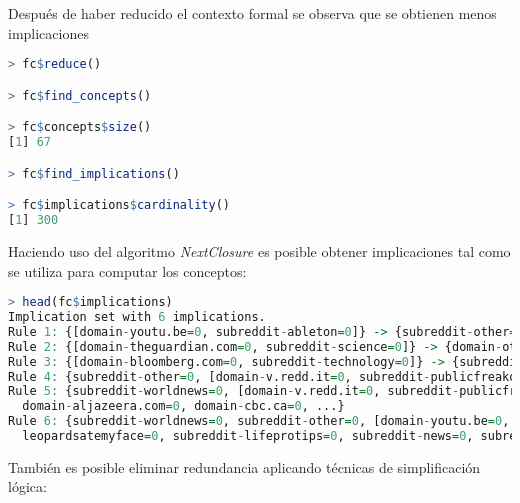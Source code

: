 \documentclass[../../main.tex]{subfiles}
\begin{document}
\vskip 0.2in

Después de haber reducido el contexto formal se observa que se obtienen menos implicaciones

\begin{lstlisting}[language=R]
> fc$reduce()

> fc$find_concepts()

> fc$concepts$size()
[1] 67

> fc$find_implications()

> fc$implications$cardinality()
[1] 300
\end{lstlisting}

\vskip 0.2in

Haciendo uso del algoritmo \textit{NextClosure} \cite{nextclosure} es posible obtener implicaciones tal como se utiliza para computar los conceptos:

\begin{lstlisting}[language=R]
> head(fc$implications)
Implication set with 6 implications.
Rule 1: {[domain-youtu.be=0, subreddit-ableton=0]} -> {subreddit-other=0}
Rule 2: {[domain-theguardian.com=0, subreddit-science=0]} -> {domain-other=0}
Rule 3: {[domain-bloomberg.com=0, subreddit-technology=0]} -> {subreddit-worldnews=0, subreddit-other=0}
Rule 4: {subreddit-other=0, [domain-v.redd.it=0, subreddit-publicfreakout=0]} -> subreddit-lifeprotips=0, subreddit-news=0, subreddit-todayilearned=0, subreddit-worldnews=0, [domain-bloomberg.com=0, subreddit-technology=0], [domain-theguardian.com=0, subreddit-science=0], [domain-youtu.be=0, subreddit-ableton=0], ...}
Rule 5: {subreddit-worldnews=0, [domain-v.redd.it=0, subreddit-publicfreakout=0]} -> {upvote_ratio-Low=0, upvote_ratio-Medium=0, upvote_ratio-High=1, total_awards_received-Low=1, total_awards_received-Medium=0, total_awards_received-High=0, score-Low=1, score-Medium=0, score-High=0, domain-abc.net.au=0,
  domain-aljazeera.com=0, domain-cbc.ca=0, ...}
Rule 6: {subreddit-worldnews=0, subreddit-other=0, [domain-youtu.be=0, subreddit-ableton=0]} -> subreddit-
  leopardsatemyface=0, subreddit-lifeprotips=0, subreddit-news=0, subreddit-todayilearned=0, [domain-bloomberg.com=0, subreddit-technology=0], [domain-theguardian.com=0, subreddit-science=0], [domain-v.redd.it=0, subreddit-publicfreakout=0], ...}

\end{lstlisting}

\vskip 0.2in

También es posible eliminar redundancia aplicando técnicas de simplificación lógica:
\end{document}

